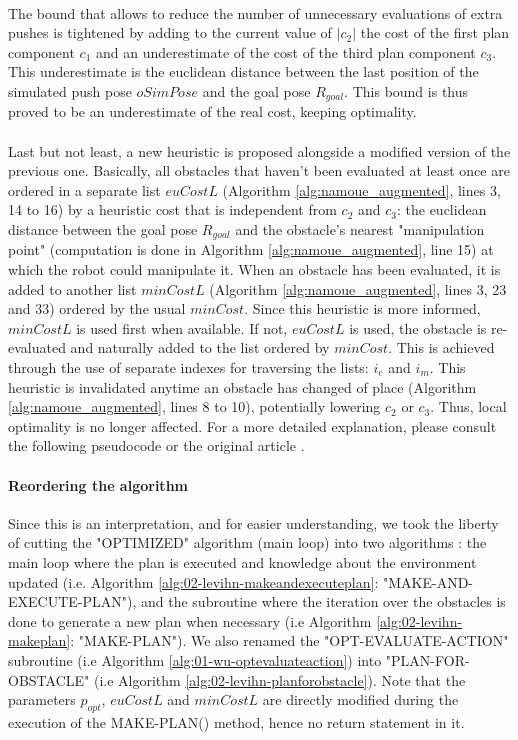\paragraph{} The bound that allows to reduce the number of unnecessary evaluations of extra pushes is tightened by adding to the current value of $|c_{2}|$ the cost of the first plan component $c_{1}$ and an underestimate of the cost of the third plan component $c_{3}$. This underestimate is the euclidean distance between the last position of the simulated push pose $oSimPose$ and the goal pose $R_{goal}$. This bound is thus proved to be an underestimate of the real cost, keeping optimality.

\paragraph{} Last but not least, a new heuristic is proposed alongside a modified version of the previous one. Basically, all obstacles that haven't been evaluated at least once are ordered in a separate list $euCostL$ (Algorithm \ref{alg:namoue_augmented}, lines 3, 14 to 16) by a heuristic cost that is independent from $c_{2}$ and $c_{3}$: the euclidean distance between the goal pose $R_{goal}$ and the obstacle's nearest "manipulation point" (computation is done in Algorithm \ref{alg:namoue_augmented}, line 15) at which the robot could manipulate it. When an obstacle has been evaluated, it is added to another list $minCostL$ (Algorithm \ref{alg:namoue_augmented}, lines 3, 23 and 33) ordered by the usual $minCost$. Since this heuristic is more informed, $minCostL$ is used first when available. If not, $euCostL$ is used, the obstacle is re-evaluated and naturally added to the list ordered by $minCost$. This is achieved through the use of separate indexes for traversing the lists: $i_{e}$ and $i_{m}$. This heuristic is invalidated anytime an obstacle has changed of place (Algorithm \ref{alg:namoue_augmented}, lines 8 to 10), potentially lowering $c_{2}$ or $c_{3}$. Thus, local optimality is no longer affected. For a more detailed explanation, please consult the following pseudocode or the original article \parencite{levihn_locally_2014}.

\paragraph{Reordering the algorithm} Since this is an interpretation, and for easier understanding, we took the liberty of cutting the "OPTIMIZED" algorithm (main loop) into two algorithms : the main loop where the plan is executed and knowledge about the environment updated (i.e. Algorithm \ref{alg:02-levihn-makeandexecuteplan}: "MAKE-AND-EXECUTE-PLAN"), and the subroutine where the iteration over the obstacles is done to generate a new plan when necessary (i.e Algorithm \ref{alg:02-levihn-makeplan}: "MAKE-PLAN"). We also renamed the "OPT-EVALUATE-ACTION" subroutine (i.e Algorithm \ref{alg:01-wu-optevaluateaction}) into "PLAN-FOR-OBSTACLE" (i.e Algorithm \ref{alg:02-levihn-planforobstacle}). Note that the parameters $p_{opt}$, $euCostL$ and $minCostL$ are directly modified during the execution of the MAKE-PLAN() method, hence no return statement in it.

